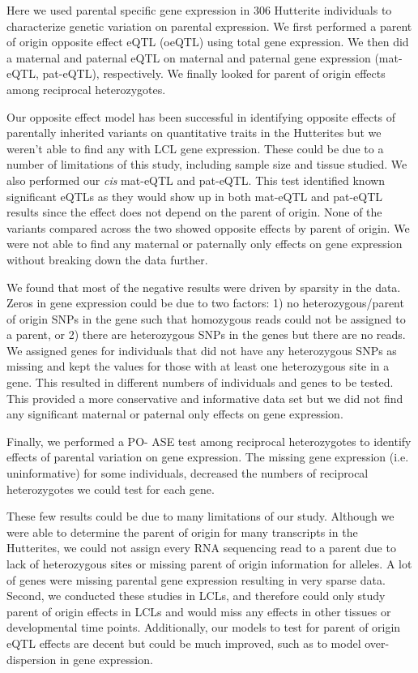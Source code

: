 Here we used parental specific gene expression in 306 Hutterite individuals to characterize genetic variation on parental expression. We first performed a parent of origin opposite effect eQTL (oeQTL) using total gene expression. We then did a maternal and paternal eQTL on maternal and paternal gene expression (mat-eQTL, pat-eQTL), respectively. We finally looked for parent of origin effects among reciprocal heterozygotes.

Our opposite effect model has been successful in identifying opposite effects of parentally inherited variants on quantitative traits in the Hutterites but we weren't able to find any with LCL gene expression. These could be due to a number of limitations of this study, including sample size and tissue studied. We also performed our \emph{cis} mat-eQTL and pat-eQTL. This test identified known significant eQTLs as they would show up in both mat-eQTL and pat-eQTL results since the effect does not depend on the parent of origin. None of the variants compared across the two showed opposite effects by parent of origin. We were not able to find any maternal or paternally only effects on gene expression without breaking down the data further.

We found that most of the negative results were driven by sparsity in the data. Zeros in gene expression could be due to two factors: 1) no heterozygous/parent of origin SNPs in the gene such that homozygous reads could not be assigned to a parent, or 2) there are heterozygous SNPs in the genes but there are no reads. We assigned genes for individuals that did not have any heterozygous SNPs as missing and kept the values for those with at least one heterozygous site in a gene. This resulted in different numbers of individuals and genes to be tested. This provided a more conservative and informative data set but we did not find any significant maternal or paternal only effects on gene expression.

Finally, we performed a PO- ASE test among reciprocal heterozygotes to identify effects of parental variation on gene expression. The missing gene expression (i.e. uninformative) for some individuals, decreased the numbers of reciprocal heterozygotes we could test for each gene.

These few results could be due to many limitations of our study. Although we were able to determine the parent of origin for many transcripts in the Hutterites, we could not assign every RNA sequencing read to a parent due to lack of heterozygous sites or missing parent of origin information for alleles. A lot of genes were missing parental gene expression resulting in very sparse data. Second, we conducted these studies in LCLs, and therefore could only study parent of origin effects in LCLs and would miss any effects in other tissues or developmental time points. Additionally, our models to test for parent of origin eQTL effects are decent but could be much improved, such as to model over-dispersion in gene expression.

